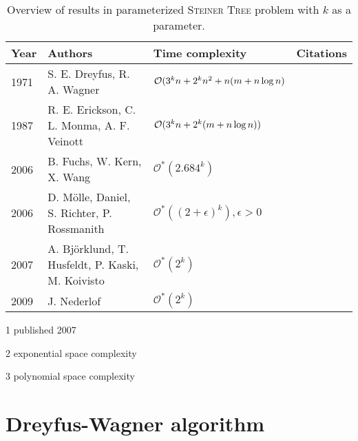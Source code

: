 \documentclass[thesis=M,english,hidelinks]{FITthesis}[2012/10/20]
\theoremstyle{definition}
\newcommand\Bstrut{\rule[-1.2ex]{0pt}{0pt}} %
\begin{document}
\begin{table}[htb]
    \centering
    \begin{threeparttable}[b]
        \caption{Overview of results in parameterized \textsc{Steiner Tree} problem with $k$ as a parameter.}
        \label{tab:terminals}

        \bgroup
        \def\arraystretch{1.5}
        \begin{tabular}{ p{1cm}  p{5cm}  p{3.5cm}  p{1.5cm} }
            \textbf{Year} & \textbf{Authors} & \textbf{Time complexity} & \textbf{Citations} \\ \hline \Bstrut
            1971 & S. E. Dreyfus, R. A. Wagner & $\mathcal{O}(3^k n + 2^k n^2 + \newline n(m + n \log n)$ &
            \cite{Dreyfus1971}
            \\
            1987 & R. E. Erickson, C. L. Monma, A. F. Veinott & $\mathcal{O}(3^k n + \newline 2^k (m + n \log n))$ &
            \cite{Erickson1987}
            \\
            2006\tnote{1} & B. Fuchs, W. Kern, X. Wang & $\mathcal{O}^*(2.684^k)$ & \cite{Fuchs2007}
            \\
            2006 & D. M{\"o}lle, Daniel, S. Richter, P. Rossmanith & $\mathcal{O}^*((2+\epsilon)^k), \epsilon > 0$ &
            \cite{Molle2006}
            \\
            2007\tnote{2} & A. Bj\"{o}rklund, T. Husfeldt, P. Kaski, M. Koivisto & $\mathcal{O}^*(2^k)$ &
            \cite{Bjorklund2007}
            \\
            2009\tnote{3} & J. Nederlof & $\mathcal{O}^*(2^k)$ & \cite{Nederlof2013} \smallskip \\ \hline
        \end{tabular}
        \egroup

        \begin{tablenotes}
            \medskip
            \item[1]{published 2007}
            \item[2]{exponential space complexity}
            \item[3]{polynomial space complexity}
        \end{tablenotes}
    \end{threeparttable}
\end{table}

\section{Dreyfus-Wagner algorithm}
\end{document}
